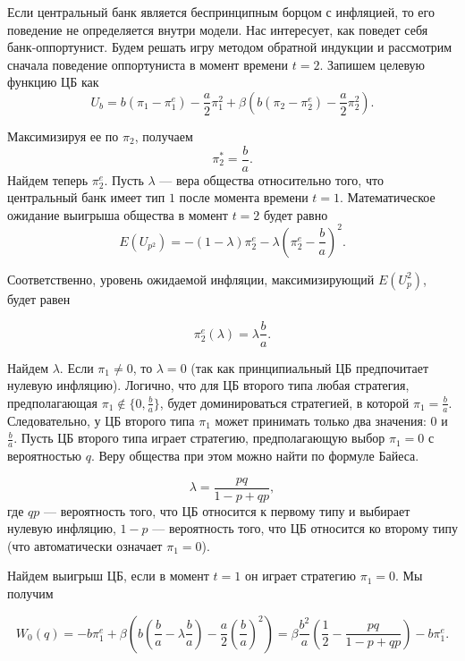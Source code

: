 \documentclass[14pt,a4paper, oneside]{extreport}
\begin{document}
Если центральный банк является беспринципным борцом с инфляцией, то его поведение не
определяется внутри модели. Нас интересует, как поведет себя банк-оппортунист. Будем решать игру методом обратной индукции и рассмотрим
сначала поведение оппортуниста в момент времени $t = 2$. Запишем целевую функцию ЦБ
как
\begin{equation} 
U_b = b (\pi_1 - \pi_1^e) - \frac{a}{2} \pi_1^2 + \beta (b(\pi_2 - \pi_2^e) - \frac{a}{2} \pi_2^2). 
\end{equation}

Максимизируя ее по $\pi_2$, получаем
\begin{equation} 
\pi_2^* = \frac{b}{a}.
\end{equation}
Найдем теперь $\pi_2^e$. Пусть $\lambda$ --- вера общества относительно того, что центральный банк имеет тип $1$ после момента времени $t=1$. Математическое ожидание выигрыша общества в момент $t=2$ будет равно
\begin{equation}
E(U_{p^2}) = -(1-\lambda)\pi_2^e - \lambda (\pi_2^e - \frac{b}{a})^2. 
\end{equation}

Соответственно, уровень ожидаемой инфляции, максимизирующий $E(U_p^2)$, будет равен 

\begin{equation}
\pi^e_2(\lambda) = \lambda \frac{b}{a}.
\end{equation}

Найдем $\lambda$. Если $\pi_1 \ne 0$, то $\lambda=0$ (так как принципиальный ЦБ предпочитает нулевую инфляцию). Логично, что для ЦБ второго типа любая стратегия, предполагающая $\pi_1 \notin \{0,\frac{b}{a}\}$, будет доминироваться стратегией, в которой $\pi_1 = \frac{b}{a}.$ Следовательно, у ЦБ второго типа $\pi_1$ может принимать только два значения: $0$ и $\frac{b}{a}$. Пусть ЦБ второго типа играет стратегию, предполагающую выбор $\pi_1 = 0$ с вероятностью $q$. Веру общества при этом можно найти по формуле Байеса. 

\begin{equation}
\lambda = \frac{p q}{1-p+qp}, 
\end{equation}
где $qp$ --- вероятность того, что ЦБ относится к первому типу и выбирает нулевую инфляцию, $1-p$ --- вероятность того, что ЦБ относится ко второму типу (что автоматически означает $\pi_1=0$). 

Найдем выигрыш ЦБ, если в момент $t=1$ он играет стратегию $\pi_1 = 0$. Мы получим

\begin{equation}
W_0(q) = -b \pi_1^e + \beta \left(b \left(\frac{b}{a}-\lambda \frac{b}{a} \right) - \frac{a}{2} \left(\frac{b}{a} \right)^2 \right) = \beta \frac{b^2}{a} \left(\frac{1}{2} - \frac{p q}{1-p+qp} \right)-b \pi_1^e.
\end{equation}
\end{document}

